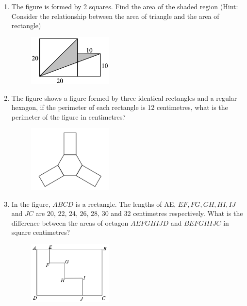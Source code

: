 \documentclass[11pt]{scrartcl}
\begin{document}
\begin{enumerate}
    \newpage\item The figure is formed by 2 squares. Find the area of the shaded region (Hint: Consider the relationship between the area of triangle and the area of rectangle)
    \begin{figure}[h]
        \centering
        \includegraphics[width=0.4\textwidth]{StarGen/AIMO Trial G3-4 2024/area2sq.png}
    \end{figure}

    \newpage\item The figure shows a figure formed by three identical rectangles and a regular hexagon, if the perimeter of each rectangle is 12 centimetres, what is the perimeter of the figure in centimetres?
    \begin{figure}[h]
        \centering
        \includegraphics[width=0.4\textwidth]{StarGen/AIMO Trial G3-4 2024/baling2.png}
    \end{figure}

    \newpage\item In the figure, $ABCD$ is a rectangle. The lengths of AE, $EF, FG, GH, HI, IJ$ and $JC$ are 20, 22, 24, 26, 28, 30 and 32 centimetres respectively. What is the difference between the areas of octagon $AEFGHIJD$ and $BEFGHIJC$ in square centimetres?
    \begin{figure}[h]
        \centering
        \includegraphics[width=0.4\textwidth]{StarGen/AIMO Trial G3-4 2024/octagon.png}
    \end{figure}
\end{enumerate}
\end{document}
